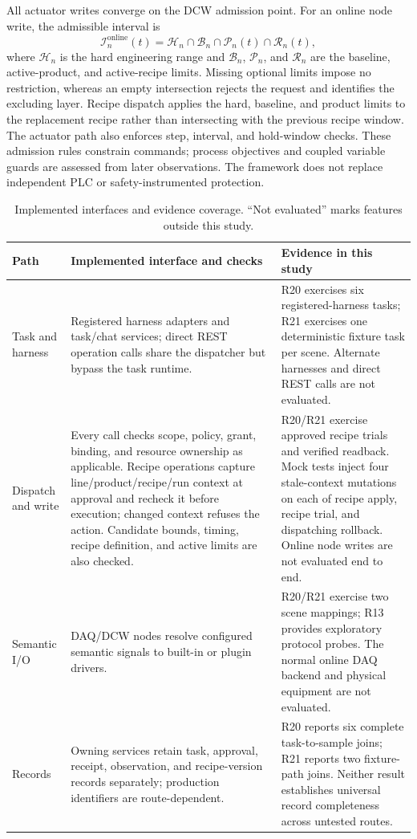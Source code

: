 All actuator writes converge on the DCW admission point. For an online node
write, the admissible interval is
\begin{equation}
\mathcal{I}^{\mathrm{online}}_n(t)=\mathcal{H}_n\cap\mathcal{B}_n
\cap\mathcal{P}_n(t)\cap\mathcal{R}_n(t),
\label{eq:admission}
\end{equation}
where $\mathcal{H}_n$ is the hard engineering range and $\mathcal{B}_n$,
$\mathcal{P}_n$, and $\mathcal{R}_n$ are the baseline, active-product, and
active-recipe limits. Missing optional limits impose no restriction, whereas
an empty intersection rejects the request and identifies the excluding
layer. Recipe dispatch applies the hard, baseline, and product limits to the
replacement recipe rather than intersecting with the previous recipe window.
The actuator path also enforces step, interval, and hold-window checks.
These admission rules constrain commands; process objectives and coupled
variable guards are assessed from later observations. The framework does
not replace independent PLC or safety-instrumented protection.

\begin{table}[!t]
\centering
\caption{Implemented interfaces and evidence coverage. “Not evaluated” marks
features outside this study.}
\label{tab:coverage}
\footnotesize
\setlength{\tabcolsep}{3pt}
\begin{tabularx}{\textwidth}{@{}p{2.0cm}X X@{}}
\toprule
Path & Implemented interface and checks & Evidence in this study \\
\midrule
Task and harness & Registered harness adapters and task/chat services; direct REST operation calls share the dispatcher but bypass the task runtime. & R20 exercises six registered-harness tasks; R21 exercises one deterministic fixture task per scene. Alternate harnesses and direct REST calls are not evaluated. \\
Dispatch and write & Every call checks scope, policy, grant, binding, and resource ownership as applicable. Recipe operations capture line/product/recipe/run context at approval and recheck it before execution; changed context refuses the action. Candidate bounds, timing, recipe definition, and active limits are also checked. & R20/R21 exercise approved recipe trials and verified readback. Mock tests inject four stale-context mutations on each of recipe apply, recipe trial, and dispatching rollback. Online node writes are not evaluated end to end. \\
Semantic I/O & DAQ/DCW nodes resolve configured semantic signals to built-in or plugin drivers. & R20/R21 exercise two scene mappings; R13 provides exploratory protocol probes. The normal online DAQ backend and physical equipment are not evaluated. \\
Records & Owning services retain task, approval, receipt, observation, and recipe-version records separately; production identifiers are route-dependent. & R20 reports six complete task-to-sample joins; R21 reports two fixture-path joins. Neither result establishes universal record completeness across untested routes. \\
\bottomrule
\end{tabularx}
\end{table}

